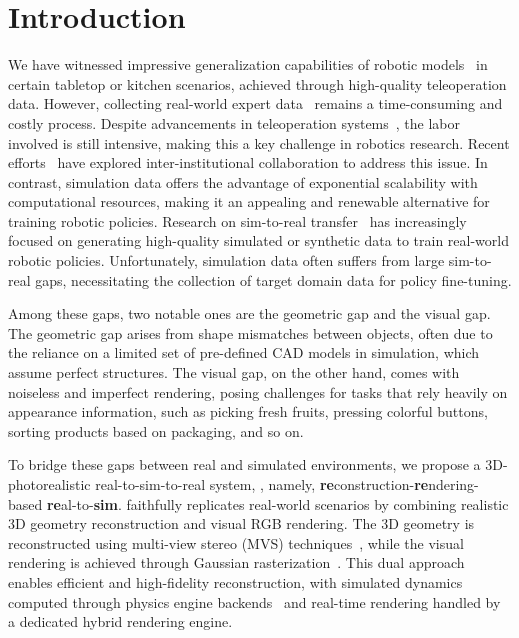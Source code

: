 \section{Introduction}
\label{sec:intro}

We have witnessed impressive generalization capabilities of robotic models~\cite{rt2, gr2,openvla,li2023vision,li2023generalist,tian2024predictive} in certain tabletop or kitchen scenarios, achieved through high-quality teleoperation data. However, collecting real-world expert data~\cite{pi0, brohan2022rt} remains a time-consuming and costly process. Despite advancements in teleoperation systems~\cite{cheng2024tv,aldaco2024aloha,yang2024ace,mobilealoha}, the labor involved is still intensive, making this a key challenge in robotics research. Recent efforts~\cite{oxe, droid} have explored inter-institutional collaboration to address this issue. In contrast, simulation data offers the advantage of exponential scalability with computational resources, making it an appealing and renewable alternative for training robotic policies. Research on sim-to-real transfer~\cite{mandlekar2023mimicgen,jiang2024dexmimicen,robocasa2024} has increasingly focused on generating high-quality simulated or synthetic data to train real-world robotic policies. Unfortunately, simulation data often suffers from large sim-to-real gaps, necessitating the collection of target domain data for policy fine-tuning.


Among these gaps, two notable ones are the geometric gap and the visual gap. The geometric gap arises from shape mismatches between objects, often due to the reliance on a limited set of pre-defined CAD models in simulation, which assume perfect structures.
The visual gap, on the other hand, comes with noiseless and imperfect rendering, posing challenges for tasks that rely heavily on appearance information, such as picking fresh fruits, pressing colorful buttons, sorting products based on packaging, and so on. 

To bridge these gaps between real and simulated environments, we propose a 3D-photorealistic real-to-sim-to-real system, \textbf{\our}, namely, \textbf{re}construction-\textbf{re}ndering-based \textbf{re}al-to-\textbf{sim}. \our faithfully replicates real-world scenarios by combining realistic 3D geometry reconstruction and visual RGB rendering. The 3D geometry is reconstructed using multi-view stereo (MVS) techniques~\cite{schoenberger2016sfm, openmvs2020}, while the visual rendering is achieved through Gaussian rasterization~\cite{kerbl3Dgaussians}. This dual approach enables efficient and high-fidelity reconstruction, with simulated dynamics computed through physics engine backends~\citep{makoviychuk2021isaac,Xiang_2020_SAPIEN,todorov2012mujoco} and real-time rendering handled by a dedicated hybrid rendering engine.

